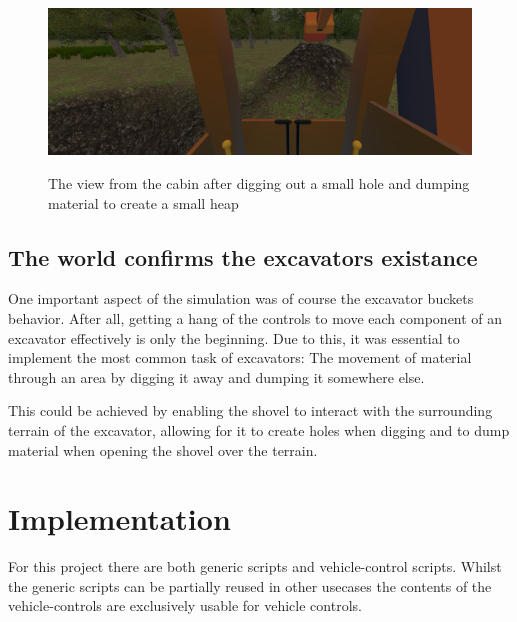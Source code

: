 \documentclass[journal]{vgtc}                     %
\begin{document}
\begin{figure}[tb]%
  \centering %
  \includegraphics[width=\columnwidth, alt={The view from the cabin of a excavator. On one side there is a smaller hole, next to it lies a small heap of material, suggesting the excavator dug it out. the shovel is placed neatly on top of the heap}]{GroundDeformation}
  \caption{%
  	The view from the cabin after digging out a small hole and dumping material to create a small heap%
  }
  \label{fig:cabin_view}
\end{figure}

\subsection{The world confirms the excavators existance}

One important aspect of the simulation was of course the excavator buckets behavior. After all, getting a hang of the controls to move each component of an excavator effectively is only the beginning. Due to this, it was essential to implement the most common task of excavators: The movement of material through an area by digging it away and dumping it somewhere else.

This could be achieved by enabling the shovel to interact with the surrounding terrain of the excavator, allowing for it to create holes when digging and to dump material when opening the shovel over the terrain.


\section{Implementation}
For this project there are both generic scripts and vehicle-control scripts. Whilst the generic scripts can be partially reused in other usecases the contents of the vehicle-controls are exclusively usable for vehicle controls.
\end{document}
